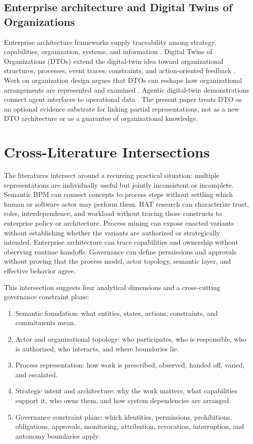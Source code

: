 \documentclass[11pt,letterpaper]{article}
\newcommand{\parencite}[1]{\citep{#1}}
\begin{document}
\subsection{Enterprise architecture and Digital Twins of Organizations}
Enterprise architecture frameworks supply traceability among strategy, capabilities, organization, systems, and information \parencite{zachman1987framework,togaf2022standard,archimate2022standard}. Digital Twins of Organizations (DTOs) extend the digital-twin idea toward organizational structures, processes, event traces, constraints, and action-oriented feedback \parencite{park2021dto,lyytinen2024dto}. Work on organization design argues that DTOs can reshape how organizational arrangements are represented and examined \parencite{lyytinen2024dto}. Agentic digital-twin demonstrations connect agent interfaces to operational data \parencite{timms2025digitaltwin}. The present paper treats DTO as an optional evidence substrate for linking partial representations, not as a new DTO architecture or as a guarantee of organizational knowledge.

\section{Cross-Literature Intersections}
The literatures intersect around a recurring practical situation: multiple representations are individually useful but jointly inconsistent or incomplete. Semantic BPM can connect concepts to process steps without settling which human or software actor may perform them. HAT research can characterize trust, roles, interdependence, and workload without tracing those constructs to enterprise policy or architecture. Process mining can expose enacted variants without establishing whether the variants are authorized or strategically intended. Enterprise architecture can trace capabilities and ownership without observing runtime handoffs. Governance can define permissions and approvals without proving that the process model, actor topology, semantic layer, and effective behavior agree.

This intersection suggests four analytical dimensions and a cross-cutting governance constraint plane:

\begin{enumerate}
\item Semantic foundation: what entities, states, actions, constraints, and commitments mean.
\item Actor and organizational topology: who participates, who is responsible, who is authorized, who interacts, and where boundaries lie.
\item Process representation: how work is prescribed, observed, handed off, varied, and escalated.
\item Strategic intent and architecture: why the work matters, what capabilities support it, who owns them, and how system dependencies are arranged.
\item Governance constraint plane: which identities, permissions, prohibitions, obligations, approvals, monitoring, attribution, revocation, interruption, and autonomy boundaries apply.
\end{enumerate}
\end{document}
